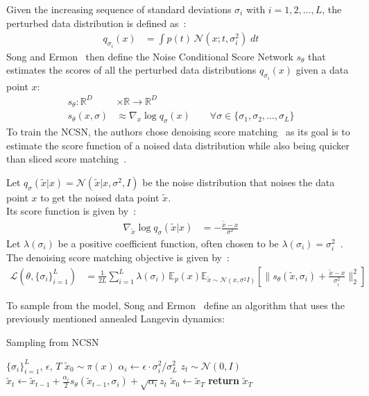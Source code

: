 \documentclass[twoside]{article}
\numberwithin{equation}{section}
\numberwithin{figure}{section}
\begin{document}
Given the increasing sequence of standard deviations $\sigma_i$ with $i = 1, 2, \ldots, L$, the perturbed data distribution is defined as~\cite{song2020generative}:
\begin{align}
  q_{\sigma_i}(x) &= \int p(t) \, \mathcal{N}(x; t, \sigma_i^2) \; dt
\end{align}
Song and Ermon~\cite{song2020generative} then define the Noise Conditional Score Network $s_\theta$ that estimates the scores of all the perturbed data distributions $q_{\sigma_i}(x)$ given a data point $x$:
\begin{align}
  s_\theta : \mathbb{R}^D &\times \mathbb{R} \rightarrow \mathbb{R}^D \\
  s_\theta (x, \sigma) &\approx \nabla_x \log q_\sigma (x) \qquad \forall \sigma \in \{ \sigma_1, \sigma_2, \ldots, \sigma_L \}
\end{align}
To train the NCSN, the authors chose denoising score matching~\cite{vincent2010denoising} as its goal is to estimate the score function of a noised data distribution while also being quicker than sliced score matching~\cite{song2020generative, song2019sliced}.

Let $q_\sigma (\tilde{x} | x) = \mathcal{N}(\tilde{x} | x, \sigma^2, I)$ be the noise distribution that noises the data point $x$ to get the noised data point $\tilde{x}$. \\
Its score function is given by~\cite{song2020generative}:
\begin{align}
  \nabla_{\tilde{x}} \log q_\sigma (\tilde{x} | x) &= - \frac{\tilde{x} - x}{\sigma^2} 
\end{align}
Let $\lambda (\sigma_i)$ be a positive coefficient function, often chosen to be $\lambda (\sigma_i) = \sigma_i^2$~\cite{songblog, song2020generative}. \\
The denoising score matching objective is given by~\cite{song2020generative}:
\begin{align}
  \mathcal{L}(\theta, \{ \sigma_i \}_{i=1}^L) &= \frac{1}{2L} \sum^L_{i=1} \lambda(\sigma_i) \, \mathbb{E}_p(x) \mathbb{E}_{\tilde{x} \sim \mathcal{N}(x, \sigma^2 I)} \left[ \| s_\theta (\tilde{x}, \sigma_i) + \frac{\tilde{x} - x}{\sigma_i^2} \|_2^2 \right]
\end{align}

To sample from the model, Song and Ermon~\cite{song2020generative} define an algorithm that uses the previously mentioned annealed Langevin dynamics:
\begin{algorithm}[H]
  \centering
  \caption{Sampling from NCSN}\label{alg:ncsn}
  \begin{algorithmic}[1]
    \Require $\{\sigma_i\}_{i=1}^L$, $\epsilon$, $T$ 
    \State $\tilde{x}_0 \sim \pi(x)$
      \State $\alpha_i \leftarrow \epsilon \cdot \sigma_i^2 / \sigma_L^2$
        \State $z_t \sim \mathcal{N}(0, I)$
        \State $\tilde{x}_t \leftarrow \tilde{x}_{t-1} + \frac{\alpha_i}{2} s_\theta (\tilde{x}_{t-1}, \sigma_i) + \sqrt{\alpha_i} z_t$
      \EndFor
      \State $\tilde{x}_0 \leftarrow \tilde{x}_T$
    \EndFor
    \State \textbf{return} $\tilde{x}_T$
  \end{algorithmic}
\end{algorithm}
\end{document}

